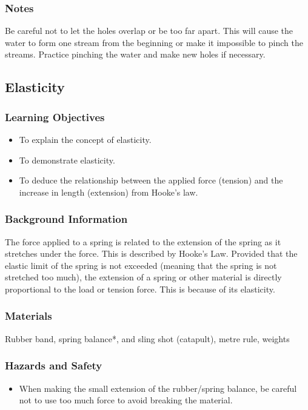 \subsubsection*{Notes}
Be careful not to let the holes overlap or be too far apart. This will cause the water to form one stream from the beginning or make it impossible to pinch the streams. Practice pinching the water and make new holes if necessary.

\subsection{Elasticity}

\subsubsection*{Learning Objectives}
\begin{itemize}
\item{To explain the concept of elasticity.} 
\item{To demonstrate elasticity.} 
\item{To deduce the relationship between the applied force (tension) and the increase in length (extension) from Hooke's law.} 
\end{itemize}

\subsubsection*{Background Information}
The force applied to a spring is related to the extension of the spring as it stretches under the force. This is described by Hooke's Law. Provided that the elastic limit of the spring is not exceeded (meaning that the spring is not stretched too much), the extension of a spring or other material is directly proportional to the load or tension force. This is because of its elasticity.

\subsubsection*{Materials}
Rubber band, spring balance*, and sling shot (catapult), metre rule, weights

\subsubsection*{Hazards and Safety}
\begin{itemize}
\item{When making the small extension of the rubber/spring balance, be careful not to use too much force to avoid breaking the material.} 
\end{itemize}



